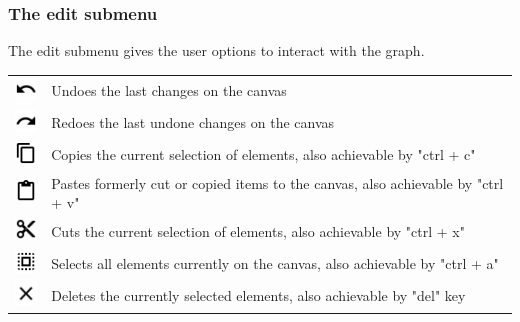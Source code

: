 {\subsubsection{The edit submenu}
The edit submenu gives the user options to interact with the graph.\\[7pt]
\begin{tabular}{p{}p{}}
 \includegraphics[scale=0.6]{figures/icons/undo.png} & Undoes the last changes on the canvas\\
 \includegraphics[scale=0.6]{figures/icons/redo.png} & Redoes the last undone changes on the canvas\\
 \includegraphics[scale=0.6]{figures/icons/copy.png} & Copies the current selection of elements, also achievable by "ctrl + c"\\
 \includegraphics[scale=0.6]{figures/icons/paste.png} & Pastes formerly cut or copied items to the canvas, also achievable by "ctrl + v"\\
 \includegraphics[scale=0.6]{figures/icons/cut.png} & Cuts the current selection of elements, also achievable by "ctrl + x" \\
 \includegraphics[scale=0.6]{figures/icons/select_all.png} & 
Selects all elements currently on the canvas, also achievable by "ctrl + a"\\
\includegraphics[scale=0.6]{figures/icons/delete_all.png} & Deletes the currently selected elements, also achievable by "del" key\\[12pt]

\end{tabular}}
